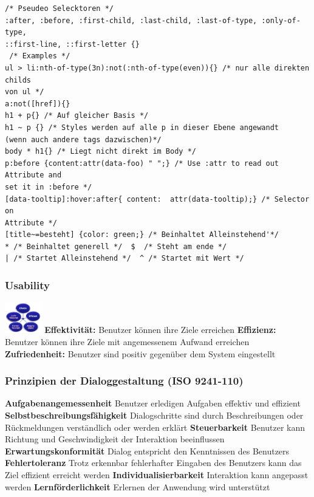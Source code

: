 \begin{multicols*}{4}
\begin{verbatim}
/* Pseudeo Selecktoren */
:after, :before, :first-child, :last-child, :last-of-type, :only-of-type,
::first-line, ::first-letter {}
 /* Examples */
ul > li:nth-of-type(3n):not(:nth-of-type(even)){} /* nur alle direkten childs 
von ul */
a:not([href]){}
h1 + p{} /* Auf gleicher Basis */
h1 ~ p {} /* Styles werden auf alle p in dieser Ebene angewandt 
(wenn auch andere tags dazwischen)*/
body * h1{} /* Liegt nicht direkt im Body */
p:before {content:attr(data-foo) " ";} /* Use :attr to read out Attribute and 
set it in :before */
[data-tooltip]:hover:after{ content:  attr(data-tooltip);} /* Selector on 
Attribute */
[title~=besteht] {color: green;} /* Beinhaltet Alleinstehend'*/
* /* Beinhaltet generell */  $  /* Steht am ende */ 
| /* Startet Alleinstehend */  ^ /* Startet mit Wert */

\end{verbatim}

\subsubsection{Usability}
\begin{multicols}{2}
 \includegraphics[width=0.120\textwidth]{images/usability-11}
 \columnbreak
 \textbf{ Effektivität:}
Benutzer können ihre Ziele erreichen
\textbf{ Effizienz: }
Benutzer können ihre Ziele mit angemessenem Aufwand erreichen
\textbf{Zufriedenheit:}
Benutzer sind positiv gegenüber dem System eingestellt
\end{multicols}

\subsubsection{Prinzipien der Dialoggestaltung (ISO 9241-110)}

\textbf{Aufgabenangemessenheit}
Benutzer erledigen Aufgaben effektiv und effizient
\textbf{Selbstbeschreibungsfähigkeit}
Dialogschritte sind durch Beschreibungen oder Rückmeldungen verständlich oder werden erklärt
\textbf{Steuerbarkeit}
Benutzer kann Richtung und Geschwindigkeit der Interaktion beeinflussen
\textbf{Erwartungskonformität}
Dialog entspricht den Kenntnissen des Benutzers
\textbf{Fehlertoleranz}
Trotz erkennbar fehlerhafter Eingaben des Benutzers kann das Ziel effizient erreicht werden
\textbf{Individualisierbarkeit}
Interaktion kann angepasst werden
\textbf{Lernförderlichkeit}
Erlernen der Anwendung wird unterstützt

\end{multicols*}
